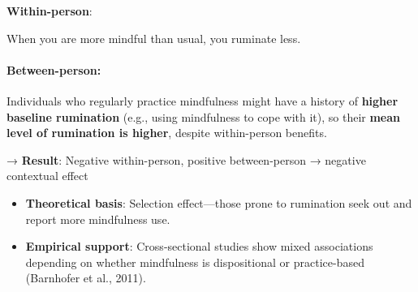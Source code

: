\textbf{Within-person}:

When you are more mindful than usual, you ruminate less.

\paragraph{\textbf{Between-person}:}

Individuals who regularly practice mindfulness might have a history of \textbf{higher baseline rumination} (e.g., using mindfulness to cope with it), so their \textbf{mean level of rumination is higher}, despite within-person benefits.

→ \textbf{Result}: Negative within-person, positive between-person → negative contextual effect

\begin{itemize}
    \item \textbf{Theoretical basis}: Selection effect—those prone to rumination seek out and report more mindfulness use.
    \item \textbf{Empirical support}: Cross-sectional studies show mixed associations depending on whether mindfulness is dispositional or practice-based (Barnhofer et al., 2011).
\end{itemize}
 